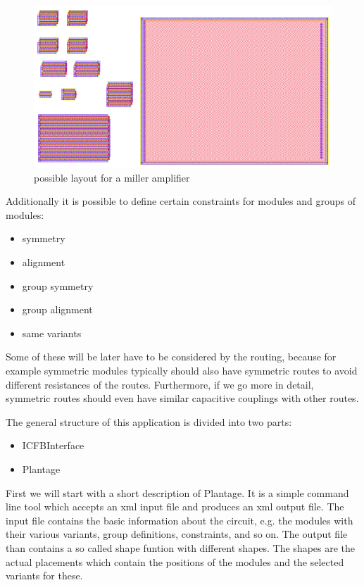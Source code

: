\begin{figure}
	\centering
	\includegraphics[scale=0.4]{FIG/miller_amplifier_layout.png}
	\caption{possible layout for a miller amplifier}
	\label{fig:miller_amplifier_layout}
\end{figure}

Additionally it is possible to define certain constraints for modules and groups of modules:
\begin{itemize}
\item symmetry
\item alignment
\item group symmetry
\item group alignment
\item same variants
\end{itemize}

Some of these will be later have to be considered by the routing, because for example symmetric modules typically should also have symmetric routes to avoid different resistances of the routes. Furthermore, if we go more in detail, symmetric routes should even have similar capacitive couplings with other routes.

The general structure of this application is divided into two parts:
\begin{itemize}
\item ICFBInterface
\item Plantage
\end{itemize}

First we will start with a short description of Plantage. It is a simple command line tool which accepts an xml input file and produces an xml output file. The input file contains the basic information about the circuit, e.g. the modules with their various variants, group definitions, constraints, and so on. The output file than contains a so called shape funtion with different shapes. The shapes are the actual placements which contain the positions of the modules and the selected variants for these.

